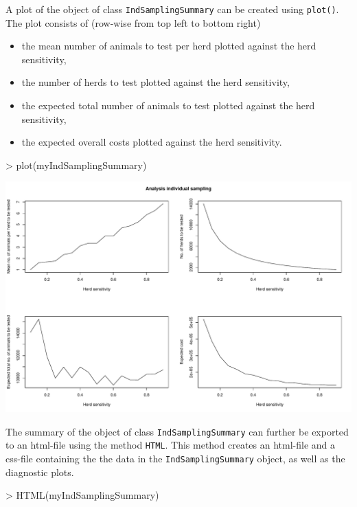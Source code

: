 \documentclass[nojss]{jss}
\begin{document}
 A plot of the object
of class \texttt{IndSamplingSummary} can be created using
\texttt{plot()}.  The
plot consists of (row-wise from top left to bottom right)

\begin{itemize}
\item the mean number of animals to test per herd plotted against the herd sensitivity,
\item the number of herds to test plotted against the herd sensitivity,
\item the expected total number of animals to test plotted against the herd sensitivity,
\item the expected overall costs plotted against the herd sensitivity.
\end{itemize}

\begin{Schunk}
\begin{Sinput}
> plot(myIndSamplingSummary)
\end{Sinput}
\end{Schunk}
\includegraphics{FFD-intro-004}

The summary of the object of class \texttt{IndSamplingSummary} can
further be exported to an html-file using the method \texttt{HTML}.
 This method creates 
an html-file and a css-file containing the the data in the 
\texttt{IndSamplingSummary} object, as well as the diagnostic plots.

\begin{Schunk}
\begin{Sinput}
> HTML(myIndSamplingSummary)
\end{Sinput}
\end{Schunk} 
\end{document}

